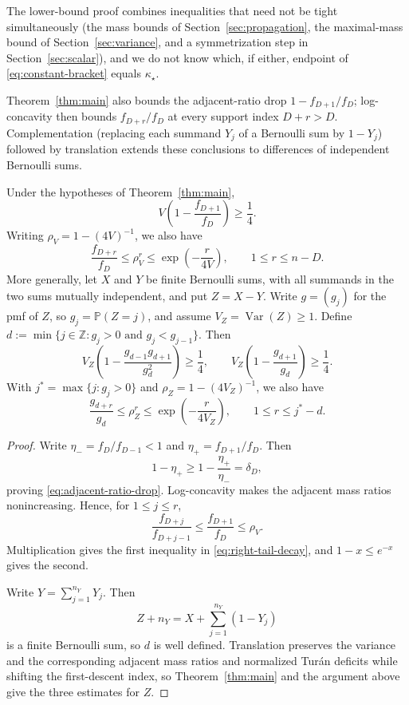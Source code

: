 \documentclass[ECP,preprint]{ejpecp}
\newcommand{\Pp}{\mathbb{P}}
\newcommand{\Var}{\operatorname{Var}}
\begin{document}
The lower-bound proof combines inequalities that need not be tight
simultaneously (the mass bounds of Section~\ref{sec:propagation}, the
maximal-mass bound of Section~\ref{sec:variance}, and a symmetrization step
in Section~\ref{sec:scalar}), and we do not know which, if either, endpoint
of \eqref{eq:constant-bracket} equals $\kappa_\star$.

Theorem~\ref{thm:main} also bounds the adjacent-ratio drop
$1-f_{D+1}/f_D$; log-concavity then bounds $f_{D+r}/f_D$ at every support
index $D+r>D$. Complementation (replacing each summand $Y_j$ of a Bernoulli
sum by $1-Y_j$) followed by translation extends these conclusions to
differences of independent Bernoulli sums.

\begin{corollary}\label{cor:tail}
  Under the hypotheses of Theorem~\ref{thm:main},
  \begin{equation}\label{eq:adjacent-ratio-drop}
    V\left(1-\frac{f_{D+1}}{f_D}\right)\geq\frac14.
  \end{equation}
  Writing $\rho_V=1-(4V)^{-1}$, we also have
  \begin{equation}\label{eq:right-tail-decay}
    \frac{f_{D+r}}{f_D}
    \leq\rho_V^r
    \leq\exp\left(-\frac{r}{4V}\right),
    \qquad 1\leq r\leq n-D.
  \end{equation}
  More generally, let $X$ and $Y$ be finite Bernoulli sums, with all summands
  in the two sums mutually independent, and put $Z=X-Y$. Write $g=(g_j)$ for
  the pmf of $Z$, so $g_j=\Pp(Z=j)$, and assume $V_Z=\Var(Z)\geq1$. Define
  $d:=\min\{j\in\mathbb Z:g_j>0\text{ and }g_j<g_{j-1}\}$. Then
  \[
    V_Z\left(1-\frac{g_{d-1}g_{d+1}}{g_d^2}\right)\geq\frac14,
    \qquad
    V_Z\left(1-\frac{g_{d+1}}{g_d}\right)\geq\frac14.
  \]
  With $j^*=\max\{j:g_j>0\}$ and $\rho_Z=1-(4V_Z)^{-1}$, we also have
  \[
    \frac{g_{d+r}}{g_d}
    \leq\rho_Z^r
    \leq\exp\left(-\frac{r}{4V_Z}\right),
    \qquad 1\leq r\leq j^*-d.
  \]
\end{corollary}

\begin{proof}
  Write $\eta_-=f_D/f_{D-1}<1$ and $\eta_+=f_{D+1}/f_D$. Then
  \[
    1-\eta_+\geq1-\frac{\eta_+}{\eta_-}=\delta_D,
  \]
  proving \eqref{eq:adjacent-ratio-drop}. Log-concavity makes the adjacent
  mass ratios nonincreasing. Hence, for $1\leq j\leq r$,
  \[
    \frac{f_{D+j}}{f_{D+j-1}}
    \leq\frac{f_{D+1}}{f_D}\leq\rho_V.
  \]
  Multiplication gives the first inequality in
  \eqref{eq:right-tail-decay}, and $1-x\leq e^{-x}$ gives the second.

  Write $Y=\sum_{j=1}^{n_Y}Y_j$. Then
  \[
    Z+n_Y=X+\sum_{j=1}^{n_Y}(1-Y_j)
  \]
  is a finite Bernoulli sum, so $d$ is well defined. Translation preserves the
  variance and the corresponding adjacent mass ratios and normalized Tur\'an
  deficits while shifting the first-descent index, so Theorem~\ref{thm:main}
  and the argument above give the three estimates for $Z$.
\end{proof}
\end{document}

